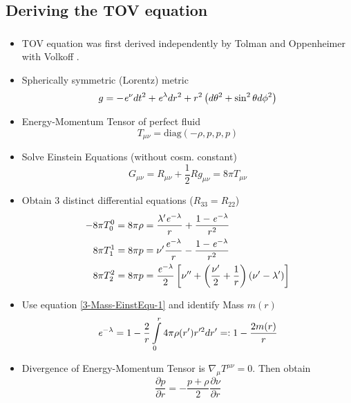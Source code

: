 \subsection{Deriving the TOV equation}
\begin{frame}
	\frametitle{\insertsubsection}
	\begin{itemize}[<+->]
		\item TOV equation was first derived 
		independently by Tolman \cite{tolmanStaticSolutionsEinstein1939} and 
		Oppenheimer with Volkoff \cite{oppenheimerMassiveNeutronCores1939}.
		\item Spherically symmetric (Lorentz) metric 
		\begin{equation}
			g=-\mathit{e}^\nu dt^2+\mathit{e}^\lambda dr^2+r^2\left(d\theta^2+\sin^2\theta d\phi^2\right)
		\end{equation}
		\item Energy-Momentum Tensor of perfect fluid
		\begin{equation}
			T_{\mu\nu}=\text{diag}(-\rho,p,p,p)
		\end{equation}
		\item Solve Einstein Equations (without cosm. constant)
		\begin{equation}
			G_{\mu\nu}=R_{\mu\nu}+\frac{1}{2}Rg_{\mu\nu}=8\pi T_{\mu\nu}
		\end{equation}
	\end{itemize}
\end{frame}

\begin{frame}
	\begin{itemize}[<+->]
		\item Obtain 3 distinct differential equations ($R_{33}=R_{22}$)
		\begin{align}
			-8\pi T_0^0 = 8\pi\rho &= \frac{\lambda'\mathit{e}^{-\lambda}}{r}+\frac{1-\mathit{e}^{-\lambda}}{r^2}\label{3-Mass-EinstEqu-1}\\
			8\pi T_1^1 = 8\pi p &= \nu'\frac{\mathit{e}^{-\lambda}}{r} - \frac{1-\mathit{e}^{-\lambda}}{r^2}\label{3-Mass-EinstEqu-2}\\
			8\pi T_2^2 = 8\pi p &= \frac{\mathit{e}^{-\lambda}}{2}\left[\nu''+\left(\frac{\nu'}{2} + \frac{1}{r}\right)\left(\nu'-\lambda'\right) \right]\label{3-Mass-EinstEqu-3}
		\end{align}
		\item Use equation \ref{3-Mass-EinstEqu-1} and identify Mass $m(r)$
		\begin{equation}
			\mathit{e}^{-\lambda}=1-\frac{2}{r}\int\limits_0^r 4\pi\rho(r')r'^2dr' =: 1-\frac{2m(r)}{r} 
			\label{3-Mass-MassDefinition}
		\end{equation}
		\item Divergence of Energy-Momentum Tensor is $\nabla_{\mu}T^{\mu\nu}=0$. Then obtain
		\begin{equation}
			\frac{\partial p}{\partial r} = -\frac{p+\rho}{2}\frac{\partial \nu}{\partial r}
			\label{3-Mass-EinstEquation2-Divergence}
		\end{equation}
	\end{itemize}
\end{frame}

